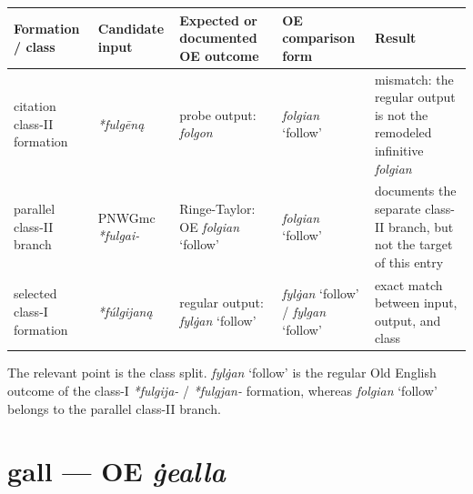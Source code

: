 \documentclass[
  british,
  a4paper,
  openany]{book}
\newcounter{none} %
\providecommand{\texorpdfstring}[2]{#1}
\begin{document}
{\def\LTcaptype{none} %
\begin{longtable}[]{@{}
  >{\raggedright\arraybackslash}p{}
  >{\raggedright\arraybackslash}p{}
  >{\raggedright\arraybackslash}p{}
  >{\raggedright\arraybackslash}p{}
  >{\raggedright\arraybackslash}p{}@{}}
\toprule\noalign{}
\begin{minipage}[b]{\linewidth}\raggedright
Formation / class
\end{minipage} & \begin{minipage}[b]{\linewidth}\raggedright
Candidate input
\end{minipage} & \begin{minipage}[b]{\linewidth}\raggedright
Expected or documented OE outcome
\end{minipage} & \begin{minipage}[b]{\linewidth}\raggedright
OE comparison form
\end{minipage} & \begin{minipage}[b]{\linewidth}\raggedright
Result
\end{minipage} \\
\midrule\noalign{}
\endhead
\bottomrule\noalign{}
\endlastfoot
citation class-II formation & {\emph{*fulgēną}} & probe output:
{\emph{folgon}} & {\emph{folgian}} `follow' & mismatch: the regular
output is not the remodeled infinitive \emph{folgian} \\
parallel class-II branch & PNWGmc \emph{*fulgai-} & Ringe-Taylor: OE
{\emph{folgian}} `follow' & {\emph{folgian}} `follow' & documents the
separate class-II branch, but not the target of this entry \\
selected class-I formation & {\emph{*fúlgijaną}} & regular output:
{\emph{fylġan}} `follow' & {\emph{fylġan}} `follow' / {\emph{fylgan}}
`follow' & exact match between input, output, and class \\
\end{longtable}
}

The relevant point is the class split. {\emph{fylġan}} `follow' is the
regular Old English outcome of the class-I \emph{*fulgija-} /
\emph{*fulgjan-} formation, whereas {\emph{folgian}} `follow' belongs to
the parallel class-II branch.

\section{\texorpdfstring{gall --- OE
\emph{ġealla}}{gall --- OE ġealla}}\label{gall-oe-ux121ealla}
\end{document}
